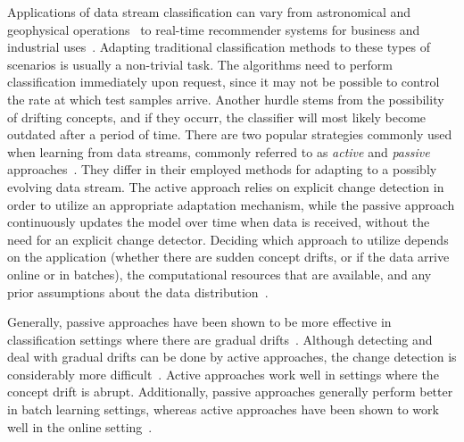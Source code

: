 \documentclass[reqno]{vcuthesis}
\numberwithin{equation}{chapter}
\begin{document}
Applications of data stream classification can vary from astronomical and geophysical operations~\cite{burl1999diamond} to real-time recommender systems for business and industrial uses~\cite{kargupta2002mobimine,kargupta2004vedas}. Adapting traditional classification methods to these types of scenarios is usually a non-trivial task. The algorithms need to perform classification immediately upon request, since it may not be possible to control the rate at which test samples arrive. Another hurdle stems from the possibility of drifting concepts, and if they occurr, the classifier will most likely become outdated after a period of time. There are two popular strategies commonly used when learning from data streams, commonly referred to as \textit{active} and \textit{passive} approaches~\cite{ditzler2015learning,elwell2011incremental}. They differ in their employed methods for adapting to a possibly evolving data stream. The active approach relies on explicit change detection in order to utilize an appropriate adaptation mechanism, while the passive approach continuously updates the model over time when data is received, without the need for an explicit change detector. Deciding which approach to utilize depends on the application (whether there are sudden concept drifts, or if the data arrive online or in batches), the computational resources that are available, and any prior assumptions about the data distribution~\cite{alippi2014intelligence}. 

Generally, passive approaches have been shown to be more effective in classification settings where there are gradual drifts~\cite{elwell2011incremental}. Although detecting and deal with gradual drifts can be done by active approaches, the change detection is considerably more difficult~\cite{alippi2009just}. Active approaches work well in settings where the concept drift is abrupt. Additionally, passive approaches generally perform better in batch learning settings, whereas active approaches have been shown to work well in the online setting~\cite{bifet2007learning,gama2004learning}.
\end{document}

